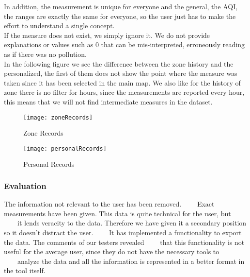 In addition, the measurement is unique for everyone and the general, the AQI, the ranges are exactly the same for everyone, so the user just has to make the effort to understand a single concept.\\

If the measure does not exist, we simply ignore it. We do not provide explanations or values such as 0 that can be mis-interpreted, erroneously reading as if there was no pollution.\\


In the following figure we see the difference between the zone history and the personalized, the first of them does not show
the point where the measure was taken since it has been selected in the main map. We also like for the history of
zone there is no filter for hours, since the measurements are reported every hour, this means that we will not find
intermediate measures in the dataset.\\

\newpage
\begin{figure}[ht]
    \centering
    \texttt{[image: zoneRecords]}
    \caption{Zone Records}
\end{figure}
\begin{figure}[ht]
    \centering
    \texttt{[image: personalRecords]}
    \caption{Personal Records}
\end{figure}

\subsubsection*{Evaluation}  

\begin{itemize}
    \done The information not relevant to the user has been removed.
    \crossed Exact measurements have been given. This data is quite technical for the user, but 
    it lends veracity to the data. Therefore we have given it a secondary position so it doesn't distract the user.
    \crossed It has implemented a functionality to export the data. The comments of our testers revealed
    that this functionality is not useful for the average user, since they do not have the necessary tools to
    analyze the data and all the information is represented in a better format in the tool itself.
\end{itemize}
